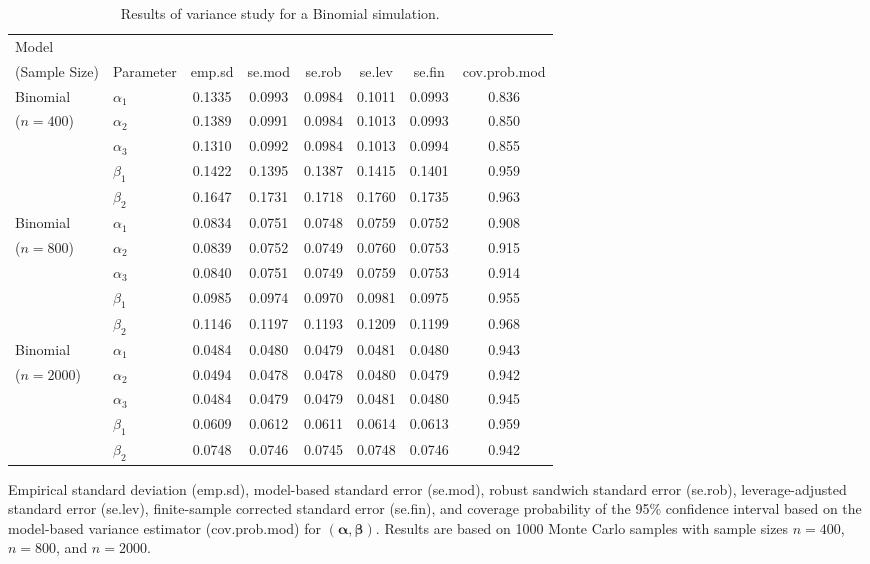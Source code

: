 \begin{table}[ht!]
\centering
\begin{threeparttable}
\caption{Results of variance study for a Binomial simulation.}
\label{tab:variance_study_bino}
\begin{tabular}{llcccccc}
\toprule
\multicolumn{8}{l}{Model} \\
(Sample Size) & Parameter & emp.sd & se.mod & se.rob & se.lev & se.fin & cov.prob.mod \\
\midrule
Binomial & $\alpha_{1}$ & 0.1335 & 0.0993 & 0.0984 & 0.1011 & 0.0993 & 0.836 \\
($n=400$) & $\alpha_{2}$ & 0.1389 & 0.0991 & 0.0984 & 0.1013 & 0.0993 & 0.850 \\
 & $\alpha_{3}$ & 0.1310 & 0.0992 & 0.0984 & 0.1013 & 0.0994 & 0.855 \\
 & $\beta_{1}$  & 0.1422 & 0.1395 & 0.1387 & 0.1415 & 0.1401 & 0.959 \\
 & $\beta_{2}$  & 0.1647 & 0.1731 & 0.1718 & 0.1760 & 0.1735 & 0.963 \\
\midrule
Binomial & $\alpha_{1}$ & 0.0834 & 0.0751 & 0.0748 & 0.0759 & 0.0752 & 0.908 \\
($n=800$) & $\alpha_{2}$ & 0.0839 & 0.0752 & 0.0749 & 0.0760 & 0.0753 & 0.915 \\
 & $\alpha_{3}$ & 0.0840 & 0.0751 & 0.0749 & 0.0759 & 0.0753 & 0.914 \\
 & $\beta_{1}$  & 0.0985 & 0.0974 & 0.0970 & 0.0981 & 0.0975 & 0.955 \\
 & $\beta_{2}$  & 0.1146 & 0.1197 & 0.1193 & 0.1209 & 0.1199 & 0.968 \\
\midrule
Binomial & $\alpha_{1}$ & 0.0484 & 0.0480 & 0.0479 & 0.0481 & 0.0480 & 0.943 \\
($n=2000$) & $\alpha_{2}$ & 0.0494 & 0.0478 & 0.0478 & 0.0480 & 0.0479 & 0.942 \\
 & $\alpha_{3}$ & 0.0484 & 0.0479 & 0.0479 & 0.0481 & 0.0480 & 0.945 \\
 & $\beta_{1}$  & 0.0609 & 0.0612 & 0.0611 & 0.0614 & 0.0613 & 0.959 \\
 & $\beta_{2}$  & 0.0748 & 0.0746 & 0.0745 & 0.0748 & 0.0746 & 0.942 \\
\bottomrule
\end{tabular}
\begin{tablenotes}
\footnotesize
\item Empirical standard deviation (emp.sd), model-based standard error (se.mod), robust sandwich standard error (se.rob), leverage-adjusted standard error (se.lev), finite-sample corrected standard error (se.fin), and coverage probability of the 95\% confidence interval based on the model-based variance estimator (cov.prob.mod) for $(\boldsymbol{\alpha}, \boldsymbol{\beta})$. Results are based on 1000 Monte Carlo samples with sample sizes $n = 400$, $n = 800$, and $n = 2000$.
\end{tablenotes}
\end{threeparttable}
\end{table}
 